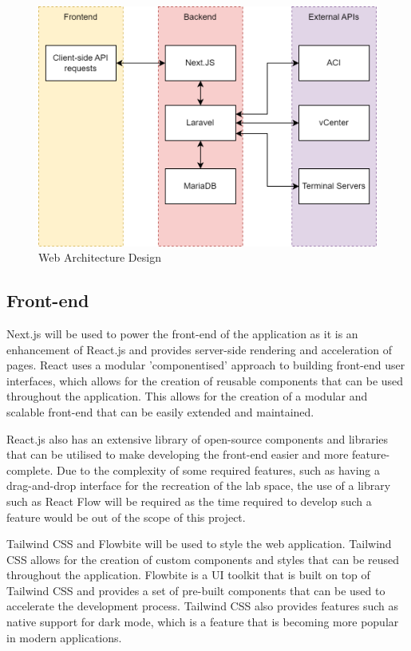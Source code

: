 \begin{figure}[H]
    \centering

    \includegraphics[scale=0.3]{images/web-architecture.png}
    \caption{Web
        Architecture Design}
    \label{fig:web-architecture}
\end{figure}

\subsection{Front-end}
\label{design:web-application:front-end}
Next.js will be
used to power the front-end of the application as it is an enhancement of
React.js and provides server-side rendering and acceleration of pages. React
uses a modular 'componentised' approach to building front-end user interfaces, which allows
for the creation of reusable components that can be used throughout the
application. This allows for the creation of a modular and scalable front-end
that can be easily extended and maintained.

React.js also has an extensive
library of open-source components and libraries that can be utilised to make
developing the front-end easier and more feature-complete. Due to the complexity
of some required features, such as having a drag-and-drop interface for the
recreation of the lab space, the use of a library such as React Flow will be
required as the time required to develop such a feature would be out of the
scope of this project.

Tailwind CSS and Flowbite will be used to style the web application. Tailwind CSS allows for the creation of custom components and styles that can be reused throughout the application. Flowbite is a UI toolkit that is built on top of Tailwind CSS and provides a set of pre-built components that can be used to accelerate the development process. Tailwind CSS also provides features such as native support for dark mode, which is a feature that is becoming more popular in modern applications.

